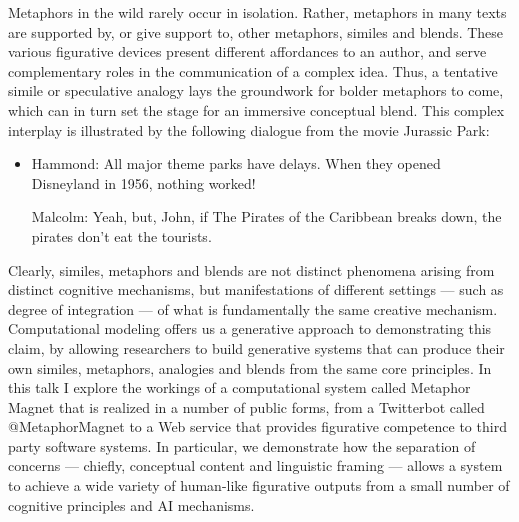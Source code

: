 \documentclass[10pt,letterpaper]{article}
\begin{document}
Metaphors in the wild rarely occur in isolation. Rather, metaphors in many texts are supported by, or give support to, other metaphors, similes and blends. These various figurative devices present different affordances to an author, and serve complementary roles in the communication of a complex idea. Thus, a tentative simile or speculative analogy lays the groundwork for bolder metaphors to come, which can in turn set the stage for an immersive conceptual blend. This complex interplay is illustrated by the following dialogue from the movie Jurassic Park:
\begin{itemize}
\item[] Hammond: All major theme parks have delays. When they opened Disneyland in 1956, nothing worked! 

Malcolm: Yeah, but, John, if The Pirates of the Caribbean breaks down, the pirates don't eat the tourists.  
\end{itemize}
Clearly, similes, metaphors and blends are not distinct phenomena arising from distinct cognitive mechanisms, but manifestations of different settings --- such as degree of integration --- of what is fundamentally the same creative mechanism. Computational modeling offers us a generative approach to demonstrating this 
claim, by allowing researchers to build generative systems that can produce their own similes, metaphors, analogies and blends from the same core principles. In this talk I explore the workings of a computational system called Metaphor Magnet that is realized in a number of public forms, from a Twitterbot called @MetaphorMagnet to a Web service that provides figurative competence to third party software systems. In particular, we demonstrate how the separation of concerns --- chiefly, conceptual content and linguistic framing --- allows a system to achieve a wide variety of human-like figurative outputs from a small number of cognitive principles and AI mechanisms.




\setlength{\bibleftmargin}{.125in}
\setlength{\bibindent}{-\bibleftmargin}


\end{document}
